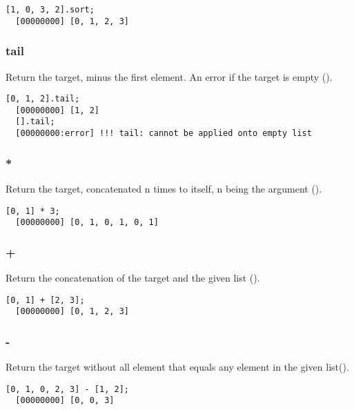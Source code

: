 \begin{lstlisting}[caption=List.sort, label=lst:list-sort, float=\floatposh]
  [1, 0, 3, 2].sort;
  [00000000] [0, 1, 2, 3]
\end{lstlisting}

\subsubsection{tail}

Return the target, minus the first element. An error if the target is
empty ().

\begin{lstlisting}[caption=List.tail, label=lst:list-tail, float=\floatposh]
  [0, 1, 2].tail;
  [00000000] [1, 2]
  [].tail;
  [00000000:error] !!! tail: cannot be applied onto empty list
\end{lstlisting}

\subsubsection{*}

Return the target, concatenated n times to itself, n being the
argument ().

\begin{lstlisting}[caption=List.'*', label=lst:list-times,
  float=\floatposh]
  [0, 1] * 3;
  [00000000] [0, 1, 0, 1, 0, 1]
\end{lstlisting}

\subsubsection{+}

Return the concatenation of the target and the given list
().

\begin{lstlisting}[caption=List.'+', label=lst:list-plus,
  float=\floatpos]
  [0, 1] + [2, 3];
  [00000000] [0, 1, 2, 3]
\end{lstlisting}

\subsubsection{-}

Return the target without all element that equals any element in the
given list().

\begin{lstlisting}[caption=List.'', label=lst:list-minus,
  float=\floatpos]
  [0, 1, 0, 2, 3] - [1, 2];
  [00000000] [0, 0, 3]
\end{lstlisting}

